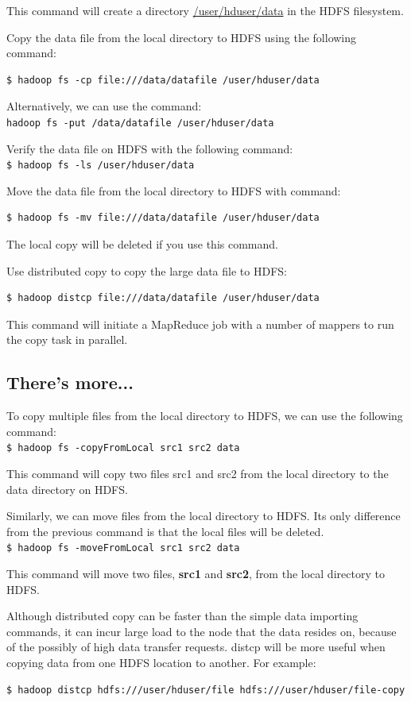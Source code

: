 This command will create a directory \url{/user/hduser/data} in the HDFS filesystem.

Copy the data file from the local directory to HDFS using the following command:
\lstset{style=bashstyle}
\begin{lstlisting}
$ hadoop fs -cp file:///data/datafile /user/hduser/data
\end{lstlisting}

Alternatively, we can use the command: \\
\verb|hadoop fs -put /data/datafile /user/hduser/data|

Verify the data file on HDFS with the following command: \\
\verb|$ hadoop fs -ls /user/hduser/data|

Move the data file from the local directory to HDFS with command:
\lstset{style=bashstyle}
\begin{lstlisting}
$ hadoop fs -mv file:///data/datafile /user/hduser/data
\end{lstlisting}

The local copy will be deleted if you use this command.

Use distributed copy to copy the large data file to HDFS:
\lstset{style=bashstyle}
\begin{lstlisting}
$ hadoop distcp file:///data/datafile /user/hduser/data
\end{lstlisting}
This command will initiate a MapReduce job with a number of mappers to run the copy task in parallel.
\subsection*{There's more...}
To copy multiple files from the local directory to HDFS, we can use the following command: \\
\verb|$ hadoop fs -copyFromLocal src1 src2 data|

This command will copy two files src1 and src2 from the local directory to the data directory on HDFS.

Similarly, we can move files from the local directory to HDFS. Its only difference from the previous command is that the local files will be deleted. \\
\verb|$ hadoop fs -moveFromLocal src1 src2 data|

This command will move two files, \textbf{src1} and \textbf{src2}, from the local directory to HDFS.

Although distributed copy can be faster than the simple data importing commands, it can incur large load to the node that the data resides on, because of the possibly of high data transfer requests. distcp will be more useful when copying data from one HDFS location to another. For example:
\lstset{style=bashstyle}
\begin{lstlisting}
$ hadoop distcp hdfs:///user/hduser/file hdfs:///user/hduser/file-copy
\end{lstlisting}
